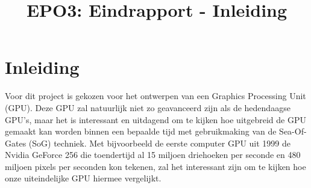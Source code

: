 \documentclass{scrartcl} %
\author{}
\title{EPO3: Eindrapport - Inleiding}
\begin{document}
\chapter{Inleiding}
\label{ch:inleiding}

Voor dit project is gekozen voor het ontwerpen van een Graphics Processing Unit (GPU).
Deze GPU zal natuurlijk niet zo geavanceerd zijn als de hedendaagse GPU's, maar het is interessant en uitdagend om te kijken hoe uitgebreid de GPU gemaakt kan worden binnen een bepaalde tijd met gebruikmaking van de Sea-Of-Gates (SoG) techniek.
Met bijvoorbeeld de eerste computer GPU uit 1999 de Nvidia GeForce 256 die toendertijd al 15 miljoen driehoeken per seconde en 480 miljoen pixels per seconden kon tekenen, zal het interessant zijn om te kijken hoe onze uiteindelijke GPU hiermee vergelijkt. \cite{geforce256}
\end{document}
